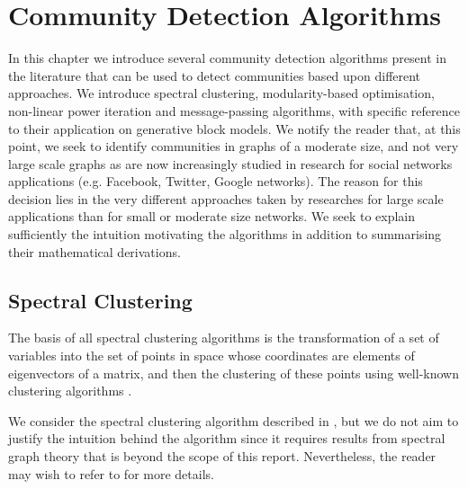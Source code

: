 
\chapter{Community Detection Algorithms}

\label{cha:communityDetectionAlgorithms}


In this chapter we introduce several community detection algorithms present in the literature that can be used to detect communities based upon different approaches.
We introduce spectral clustering, modularity-based optimisation, non-linear power iteration and message-passing algorithms, with specific reference to their application on generative block models.
We notify the reader that, at this point, we seek to identify communities in graphs of a moderate size, and not very large scale graphs as are now increasingly studied in research for social networks applications (e.g. Facebook, Twitter, Google networks).
The reason for this decision lies in the very different approaches taken by researches for large scale applications than for small or moderate size networks.
We seek to explain sufficiently the intuition motivating the algorithms in addition to summarising their mathematical derivations.


\section{Spectral Clustering}
\label{sec:spectralClustering}

The basis of all spectral clustering algorithms is the transformation of a set of variables into the set of points in space whose coordinates are elements of eigenvectors of a matrix, and then the clustering of these points using well-known clustering algorithms \cite{Lux06,For10}.


We consider the spectral clustering algorithm described in \cite{Lux06,For10}, but we do not aim to justify the intuition behind the algorithm since it requires results from spectral graph theory that is beyond the scope of this report.
Nevertheless, the reader may wish to refer to \cite{Lux06,Spi07,For10} for more details.

